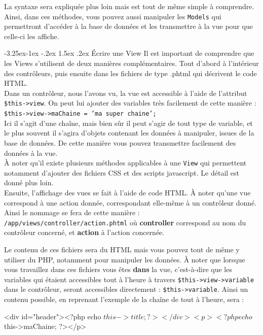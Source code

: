 \documentclass[a4paper,11pt]{article}
\makeatletter
\renewcommand{\subsection}{\@startsection{subsection}{2}{\z@}%
             {-3.25ex\@plus -1ex \@minus -.2ex}%
             {1.5ex \@plus .2ex}%
             {\color{bleuFonce}\normalfont\large\bfseries}}
\makeatother
\begin{document}
La syntaxe sera expliquée plus loin mais est tout de même simple à comprendre.\\

Ainsi, dans ces méthodes, vous pouvez aussi manipuler les \texttt{Models} qui permettront d'accéder à la base de données et les transmettre à la vue pour que celle-ci les affiche.

\subsection{Écrire une View}
Il est important de comprendre que les Views s'utilisent de deux manières complémentaires. Tout d'abord à l'intérieur des contrôleurs, puis ensuite dans les fichiers de type .phtml qui décrivent le code HTML.\\

Dans un contrôleur, nous l'avons vu, la vue est accessible à l'aide de l'attribut \texttt{\$this->view}. On peut lui ajouter des variables très facilement de cette manière : \texttt{\$this->view->maChaine = 'ma super chaine';}\\
Ici il s'agit d'une chaîne, mais bien sûr il peut s'agir de tout type de variable, et le plus souvent il s'agira d'objets contenant les données à manipuler, issues de la base de données. De cette manière vous pouvez transmettre facilement des données à la vue.\\

À noter qu'il existe plusieurs méthodes applicables à une \texttt{View} qui permettent notamment d'ajouter des fichiers CSS et des scripts javascript. Le détail est donné plus loin.\\

Ensuite, l'affichage des vues se fait à l'aide de code HTML. À noter qu'une vue correspond à une action donnée, correspondant elle-même à un contrôleur donné. Ainsi le nommage se fera de cette manière : \\\texttt{/app/views/controller/action.phtml} où \textbf{controller} correspond au nom du contrôleur concerné, et \textbf{action} à l'action concernée.

Le contenu de ces fichiers sera du HTML mais vous pouvez tout de même y utiliser du PHP, notamment pour manipuler les données. À noter que lorsque vous travaillez dans ces fichiers vous êtes \textbf{dans} la vue, c'est-à-dire que les variables qui étaient accessibles tout à l'heure à travers \texttt{\$this->view->variable} dans le contrôleur, seront accessibles directement : \texttt{\$this->variable}. Ainsi un contenu possible, en reprenant l'exemple de la chaîne de tout à l'heure, sera :
\begin{HTML}
<div id="header"><?php echo $this->title; ?></div>
<p><?php echo $this->maChaine; ?></p>
\end{HTML}
\end{document}
